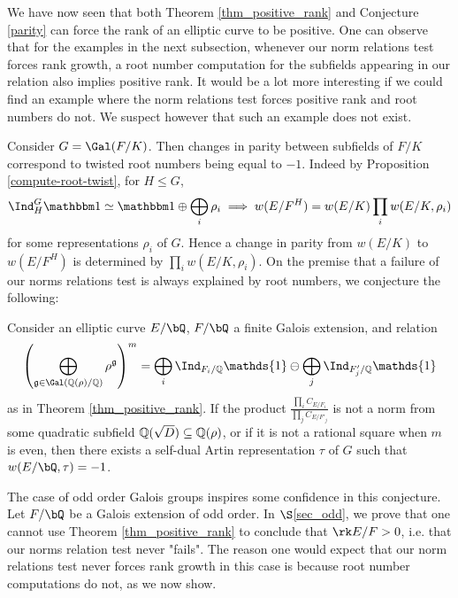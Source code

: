 We have now seen that both Theorem \ref{thm_positive_rank} and Conjecture \ref{parity} can force the rank of an elliptic curve to be positive. One can observe that for the examples in the next subsection, whenever our norm relations test forces rank growth, a root number computation for the subfields appearing in our relation also implies positive rank. 
It would be a lot more interesting if we could find an example where the norm relations test forces positive rank and root numbers do not. 
We suspect however that such an example does not exist. 

Consider $G = \Gal(F / K)$. Then changes in parity between subfields of $F / K$ correspond to twisted root numbers being equal to $-1$. Indeed by Proposition \ref{compute-root-twist}, for $H \leq G$, 
\[ \Ind_{H}^G \trivial \simeq \trivial\oplus \bigoplus_i \rho_i  \implies w(E / F^H) = w(E / K)\prod_i w(E / K, \rho_i) \] for some representations $\rho_i $ of $G $. Hence a change in parity from $w(E / K)$ to $w(E / F^H)$ is determined by $\prod_i w(E / K, \rho_i)$. On the premise that a failure of our norms relations test is always explained by root numbers, we conjecture the following:

\begin{conj}\label{conj_normtwist}
Consider an elliptic curve $E / \bQ$, $F / \bQ$ a finite Galois extension, and relation 
$$\left(\bigoplus_{\mathfrak{g}\in\Gal(\QQ(\rho)/\QQ)}\rho^{\mathfrak{g}}\right)^m=\bigoplus_i\Ind_{F_i/\QQ}\mathds{1}\ominus\bigoplus_j\Ind_{F'_j/\QQ}\mathds{1}$$
as in Theorem \ref{thm_positive_rank}. If the product $\frac{\prod_i C_{E/F_i}}{\prod_j C_{E/F'_j}}$ is not a norm from some quadratic subfield $\mathbb{Q}(\sqrt{D})\subseteq\mathbb{Q}(\rho)$, or if it is not a rational square when $m$ is even, then there exists a self-dual Artin representation $\tau$ of $G$ such that $w(E / \bQ, \tau) = -1 $. 
\end{conj}

The case of odd order Galois groups inspires some confidence in this conjecture. Let $F / \bQ$ be a Galois extension of odd order. In $\S$\ref{sec_odd}, we prove that one cannot use Theorem \ref{thm_positive_rank} to conclude that $\rk E / F > 0$, i.e. that our norms relation test never "fails".
The reason one would expect that our norm relations test never forces rank growth in this case is because root number computations do not, as we now show.

